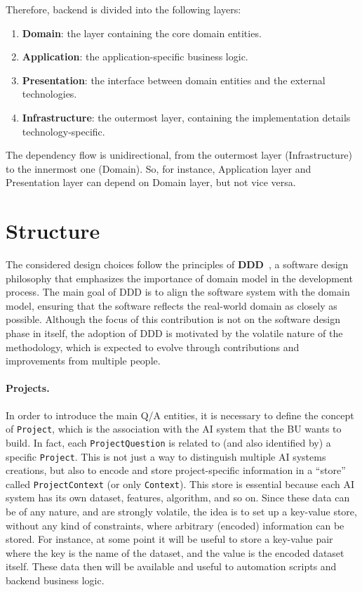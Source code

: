 \documentclass[12pt,a4paper,openright,twoside]{book}
\begin{document}
Therefore, backend is divided into the following layers:

\begin{enumerate}
    \item \textbf{Domain}: the layer containing the core domain entities.
    \item \textbf{Application}: the application-specific business logic.
    \item \textbf{Presentation}: the interface between domain entities and the external technologies.
    \item \textbf{Infrastructure}: the outermost layer, containing the implementation details technology-specific.
\end{enumerate}

% 
The dependency flow is unidirectional, from the outermost layer (Infrastructure) to the innermost one (Domain).
%
So, for instance, Application layer and Presentation layer can depend on Domain layer, but not vice versa.
%

\section{Structure}
%
The considered design choices follow the principles of \textbf{\acf{DDD}}~\cite{millett2015ddd}, a software design philosophy that emphasizes the importance of domain model in the development process.
%
The main goal of \ac{DDD} is to align the software system with the domain model, ensuring that the software reflects the real-world domain as closely as possible.
%
Although the focus of this contribution is not on the software design phase in itself, the adoption of \ac{DDD} is motivated by the volatile nature of the methodology, which is expected to evolve through contributions and improvements from multiple people.


\paragraph{Projects.}
In order to introduce the main \ac{Q/A} entities, it is necessary to define the concept of \texttt{Project}, which is the association with the \ac{AI} system that the \ac{BU} wants to build.
%
In fact, each \texttt{ProjectQuestion} is related to (and also identified by) a specific \texttt{Project}.
%
This is not just a way to distinguish multiple AI systems creations, but also to encode and store project-specific information in a ``store'' called \texttt{ProjectContext} (or only \texttt{Context}).
%
This store is essential because each \ac{AI} system has its own dataset, features, algorithm, and so on.
%
Since these data can be of any nature, and are strongly volatile, the idea is to set up a key-value store, without any kind of constraints, where arbitrary (encoded) information can be stored.
%
For instance, at some point it will be useful to store a key-value pair where the key is the name of the dataset, and the value is the encoded dataset itself.
%
These data then will be available and useful to automation scripts and backend business logic.
\end{document}
